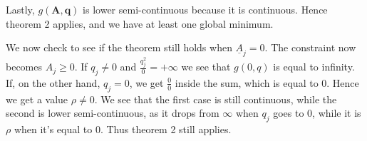 Lastly, $g(\bm{A},\bm{q})$ is lower semi-continuous because it is continuous. Hence theorem 2 applies, and we have at least one global minimum.

We now check to see if the theorem still holds when $\underline{A}_{j} = 0$. The constraint now becomes $A_{j} \geq 0$. If $q_{j} \neq 0$ and $\frac{q_{j}^2}{0} = +\infty$ we see that $g(0,q)$ is equal to infinity. If, on the other hand, $q_{j} = 0$, we get $\frac{0}{0}$ inside the sum, which is equal to 0. Hence we get a value $\rho \neq 0$. We see that the first case is still continuous, while the second is lower semi-continuous, as it drops from $\infty$ when $q_{j}$ goes to 0, while it is $\rho$ when it's equal to 0. Thus theorem 2 still applies.




